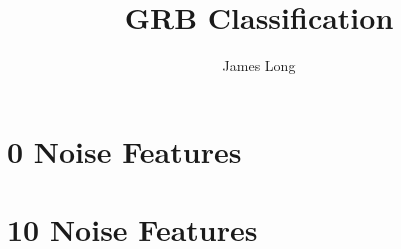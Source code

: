 \documentclass[10pt]{article}
\title{GRB Classification}
\date{}
\author{James Long}
\begin{document}
\section{0 Noise Features}






%
%

\section{10 Noise Features}




\end{document}
